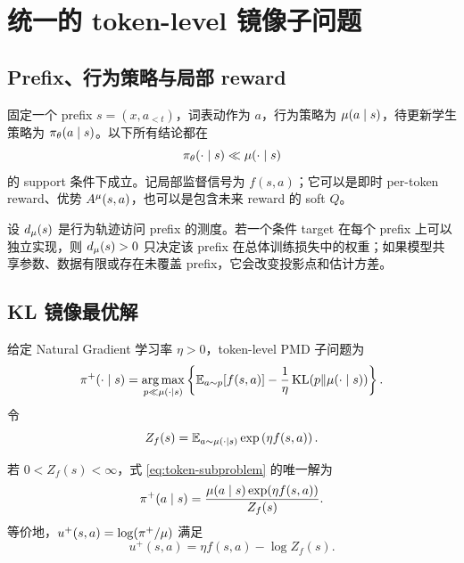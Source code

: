 \chapter{统一的 token-level 镜像子问题}
\label{ch:unified-problem}

\section{Prefix、行为策略与局部 reward}
\label{sec:notation}

固定一个 prefix $s=(x,a_{<t})$，词表动作为 $a$，行为策略为 $\mu(a\mid s)$，待更新学生策略为 $\pi_\theta(a\mid s)$。以下所有结论都在
\[
\pi_\theta(\cdot\mid s)\ll\mu(\cdot\mid s)
\]
的 support 条件下成立。记局部监督信号为 $f(s,a)$；它可以是即时 per-token reward、优势 $A^\mu(s,a)$，也可以是包含未来 reward 的 soft $Q$。

设 $d_\mu(s)$ 是行为轨迹访问 prefix 的测度。若一个条件 target 在每个 prefix 上可以独立实现，则 $d_\mu(s)>0$ 只决定该 prefix 在总体训练损失中的权重；如果模型共享参数、数据有限或存在未覆盖 prefix，它会改变投影点和估计方差。

\section{KL 镜像最优解}
\label{sec:token-optimum}

给定 Natural Gradient 学习率 $\eta>0$，token-level PMD 子问题为
\begin{equation}
\label{eq:token-subproblem}
 \pi^+(\cdot\mid s)=\operatorname*{arg\,max}_{p\ll\mu(\cdot\mid s)}
 \left\{\mathbb{E}_{a\sim p}[f(s,a)]-\frac{1}{\eta}\operatorname{KL}(p\Vert\mu(\cdot\mid s))\right\}.
\end{equation}
令
\[
 Z_f(s)=\mathbb{E}_{a\sim\mu(\cdot\mid s)}\exp\left(\eta f(s,a)\right).
\]

\begin{theorem}
\label{thm:gibbs}
若 $0<Z_f(s)<\infty$，式 \eqref{eq:token-subproblem} 的唯一解为
\begin{equation}
\label{eq:gibbs}
 \pi^+(a\mid s)=\frac{\mu(a\mid s)\exp(\eta f(s,a))}{Z_f(s)}.
\end{equation}
等价地，$u^+(s,a)=\log(\pi^+/\mu)$ 满足
\begin{equation}
\label{eq:optimal-logratio}
 u^+(s,a)=\eta f(s,a)-\log Z_f(s).
\end{equation}
\end{theorem}

